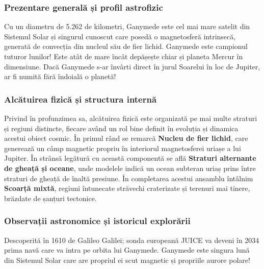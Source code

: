 \subsubsection*{Prezentare generală și profil astrofizic}
Cu un diametru de 5.262 de kilometri, Ganymede este cel mai mare satelit din Sistemul Solar și singurul cunoscut care posedă o magnetosferă intrinsecă, generată de convecția din nucleul său de fier lichid. Ganymede este campionul tuturor lunilor! Este atât de mare încât depășește chiar și planeta Mercur în dimensiune. Dacă Ganymede s-ar învârti direct în jurul Soarelui în loc de Jupiter, ar fi numită fără îndoială o planetă!

\subsubsection*{Alcătuirea fizică și structura internă}
Privind în profunzimea sa, alcătuirea fizică este organizată pe mai multe straturi și regiuni distincte, fiecare având un rol bine definit în evoluția și dinamica acestui obiect cosmic. În primul rând se remarcă \textbf{Nucleu de fier lichid}, care generează un câmp magnetic propriu în interiorul magnetosferei uriașe a lui Jupiter. În strânsă legătură cu această componentă se află \textbf{Straturi alternante de gheață și oceane}, unde modelele indică un ocean subteran uriaș prins între straturi de gheață de înaltă presiune. În completarea acestui ansamblu întâlnim \textbf{Scoarță mixtă}, regiuni întunecate străvechi craterizate și terenuri mai tinere, brăzdate de șanțuri tectonice.

\subsubsection*{Observații astronomice și istoricul explorării}
Descoperită în 1610 de Galileo Galilei; sonda europeană JUICE va deveni în 2034 prima navă care va intra pe orbita lui Ganymede. Ganymede este singura lună din Sistemul Solar care are propriul ei scut magnetic și propriile aurore polare!

